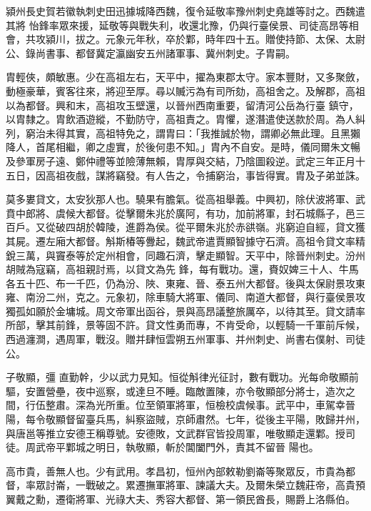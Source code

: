 \begin{pinyinscope}
 潁州長史賀若徽執刺史田迅據城降西魏，復令延敬率豫州刺史堯雄等討之。西魏遣其將
 怡鋒率眾來援，延敬等與戰失利，收還北豫，仍與行臺侯景、司徒高昂等相會，共攻潁川，拔之。元象元年秋，卒於鄴，時年四十五。贈使持節、太保、太尉公、錄尚書事、都督冀定瀛幽安五州諸軍事、冀州刺史。子胄嗣。



 胄輕俠，頗敏惠。少在高祖左右，天平中，擢為東郡太守。家本豐財，又多聚斂，動極豪華，賓客往來，將迎至厚。尋以贓污為有司所劾，高祖舍之。及解郡，高祖以為都督。興和末，高祖攻玉壁還，以晉州西南重要，留清河公岳為行臺
 鎮守，以胄隸之。胄飲酒遊縱，不勤防守，高祖責之。胄懼，遂潛遣使送款於周。為人糾列，窮治未得其實，高祖特免之，謂胄曰：「我推誠於物，謂卿必無此理。且黑獺降人，首尾相繼，卿之虛實，於後何患不知。」胄內不自安。是時，儀同爾朱文暢及參軍房子遠、鄭仲禮等並險薄無賴，胄厚與交結，乃陰圖殺逆。武定三年正月十五日，因高祖夜戲，謀將竊發。有人告之，令捕窮治，事皆得實。胄及子弟並誅。



 莫多婁貸文，太安狄那人也。驍果有膽氣。從高祖舉義。中興初，除伏波將軍、武賁中郎將、虞候大都督。從擊爾朱兆於廣阿，有功，加前將軍，封石城縣子，邑三百戶。又從破四胡於韓陵，進爵為侯。從平爾朱兆於赤谼嶺。兆窮迫自經，貸文獲其屍。遷左廂大都督。斛斯椿等釁起，魏武帝遣賈顯智據守石濟。高祖令貸文率精銳三萬，與竇泰等於定州相會，同趣石濟，擊走顯智。天平中，除晉州刺史。汾州胡賊為寇竊，高祖親討焉，以貸文為先
 鋒，每有戰功。還，賚奴婢三十人、牛馬各五十匹、布一千匹，仍為汾、陜、東雍、晉、泰五州大都督。後與太保尉景攻東雍、南汾二州，克之。元象初，除車騎大將軍、儀同、南道大都督，與行臺侯景攻獨孤如願於金墉城。周文帝軍出函谷，景與高昂議整旅厲卒，以待其至。貸文請率所部，擊其前鋒，景等固不許。貸文性勇而專，不肯受命，以輕騎一千軍前斥候，西過瀍澗，遇周軍，戰沒。贈并肆恒雲朔五州軍事、并州刺史、尚書右僕射、司徒公。



 子敬顯，彊
 直勤幹，少以武力見知。恒從斛律光征討，數有戰功。光每命敬顯前驅，安置營壘，夜中巡察，或達旦不睡。臨敵置陳，亦令敬顯部分將士，造次之間，行伍整肅。深為光所重。位至領軍將軍，恒檢校虞候事。武平中，車駕幸晉陽，每令敬顯督留臺兵馬，糾察盜賊，京師肅然。七年，從後主平陽，敗歸并州，與唐邕等推立安德王稱尊號。安德敗，文武群官皆投周軍，唯敬顯走還鄴。授司徒。周武帝平鄴城之明日，執敬顯，斬於閶闔門外，責其不留晉
 陽也。



 高市貴，善無人也。少有武用。孝昌初，恒州內部敕勒劉崙等聚眾反，市貴為都督，率眾討崙，一戰破之。累遷撫軍將軍、諫議大夫。及爾朱榮立魏莊帝，高貴預翼戴之勳，遷衛將軍、光祿大夫、秀容大都督、第一領民酋長，賜爵上洛縣伯。




\end{pinyinscope}
